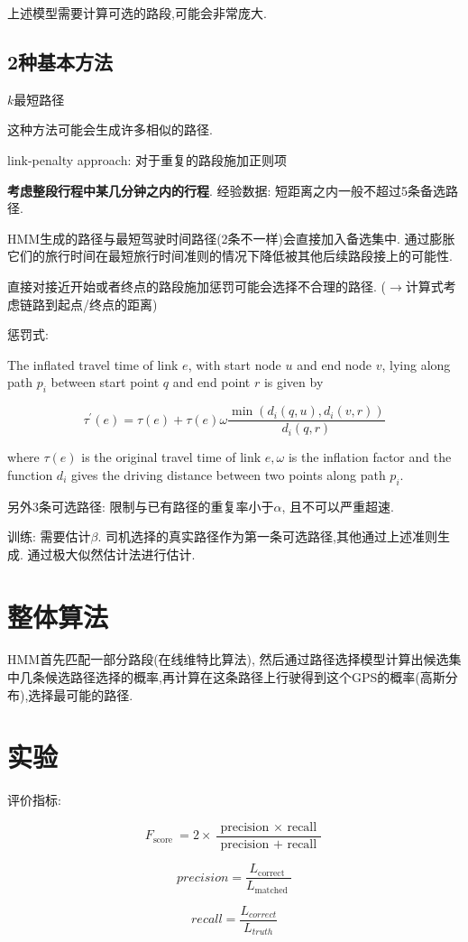 上述模型需要计算可选的路段,可能会非常庞大.

\subsection{2种基本方法}

$k$最短路径

\begin{remark}
    这种方法可能会生成许多相似的路径.
\end{remark}

link-penalty approach: 对于重复的路段施加正则项

\textbf{考虑整段行程中某几分钟之内的行程}. 经验数据: 短距离之内一般不超过5条备选路径. 

HMM生成的路径与最短驾驶时间路径(2条不一样)会直接加入备选集中. 通过膨胀它们的旅行时间在最短旅行时间准则的情况下降低被其他后续路段接上的可能性.

\begin{remark}
    直接对接近开始或者终点的路段施加惩罚可能会选择不合理的路径. ($\rightarrow$计算式考虑链路到起点/终点的距离)
\end{remark}

惩罚式:

\begin{definition}
    The inflated travel time of link $ e $, with start node $ u $ and end node $ v $, lying along path $ p_{i} $ between start point $ q $ and end point $ r $ is given by

$$ \tau^{\prime}(e)=\tau(e)+\tau(e) \omega \frac{\min \left(d_{i}(q, u), d_{i}(v, r)\right)}{d_{i}(q, r)} $$

where $ \tau(e) $ is the original travel time of link $ e, \omega $ is the inflation factor and the function $ d_{i} $ gives the driving distance
between two points along path $p_i$.
\end{definition}

另外3条可选路径: 限制与已有路径的重复率小于$\alpha$, 且不可以严重超速.

训练: 需要估计$\beta$. 司机选择的真实路径作为第一条可选路径,其他通过上述准则生成. 通过极大似然估计法进行估计.

\section{整体算法}

HMM首先匹配一部分路段(在线维特比算法), 然后通过路径选择模型计算出候选集中几条候选路径选择的概率,再计算在这条路径上行驶得到这个GPS的概率(高斯分布),选择最可能的路径.

\section{实验}

评价指标:

$$ F_{\text {score }}=2 \times \frac{\text { precision } \times \text { recall }}{\text { precision }+\text { recall }} $$

$$precision  =\frac{L_{\text {correct }}}{L_{\text {matched }}} $$

$$recall = \frac{L_{correct}}{L_{truth}}$$